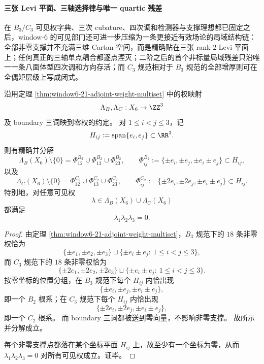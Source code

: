 \paragraph{三张 Levi 平面、三轴选择律与唯一 quartic 残差}
在 \(B_3/C_3\) 可见权字典、三次 cubature、四次调和检测器与支撑理想都已固定之后，window-\(6\) 的可见部门还可进一步压缩为一条更接近有效场论的局域结构链：全部非零支撑并不充满三维 Cartan 空间，而是精确贴在三张 rank-\(2\) Levi 平面上；任何真正的三轴单点耦合都逐点湮灭；二阶之后的首个非标量局域残差只沿唯一一条八面体型四次调和方向存活；而 \(C_3\) 规范相对于 \(B_3\) 规范的全部增厚则可在全偶矩层级上写成闭式。

\begin{theorem}\label{thm:window6-b3c3-visible-support-three-levi-planes}
沿用定理 \ref{thm:window6-21-adjoint-weight-multiset} 中的权映射
\[
\Lambda_B,\Lambda_C:X_6\to \ZZ^3
\]
及 boundary 三词映到零权的约定。
对 \(1\le i<j\le 3\)，记
\[
H_{ij}:=\operatorname{span}\{e_i,e_j\}\subset \RR^3.
\]
则有精确并分解
\[
\Lambda_B(X_6)\setminus\{0\}
=
\Phi^{B_2}_{12}\cup \Phi^{B_2}_{13}\cup \Phi^{B_2}_{23},
\qquad
\Phi^{B_2}_{ij}:=\{\pm e_i,\pm e_j,\pm e_i\pm e_j\}\subset H_{ij},
\]
以及
\[
\Lambda_C(X_6)\setminus\{0\}
=
\Phi^{C_2}_{12}\cup \Phi^{C_2}_{13}\cup \Phi^{C_2}_{23},
\qquad
\Phi^{C_2}_{ij}:=\{\pm 2e_i,\pm 2e_j,\pm e_i\pm e_j\}\subset H_{ij}.
\]
特别地，对任意可见权
\[
\lambda\in \Lambda_B(X_6)\cup \Lambda_C(X_6)
\]
都满足
\[
\lambda_1\lambda_2\lambda_3=0.
\]
\end{theorem}
\begin{proof}
由定理 \ref{thm:window6-21-adjoint-weight-multiset}，\(B_3\) 规范下的 \(18\) 条非零权恰为
\[
\{\pm e_1,\pm e_2,\pm e_3\}
\sqcup
\{\pm e_i\pm e_j:\ 1\le i<j\le 3\},
\]
而 \(C_3\) 规范下的 \(18\) 条非零权恰为
\[
\{\pm 2e_1,\pm 2e_2,\pm 2e_3\}
\sqcup
\{\pm e_i\pm e_j:\ 1\le i<j\le 3\}.
\]
按零坐标的位置分组，在 \(B_3\) 规范下每个 \(H_{ij}\) 内恰出现
\[
\{\pm e_i,\pm e_j,\pm e_i\pm e_j\},
\]
即一个 \(B_2\) 根系；在 \(C_3\) 规范下每个 \(H_{ij}\) 内恰出现
\[
\{\pm 2e_i,\pm 2e_j,\pm e_i\pm e_j\},
\]
即一个 \(C_2\) 根系。
而 boundary 三词都被送到零向量，不影响非零支撑。
故所示并分解成立。

每个非零支撑点都落在某个坐标平面 \(H_{ij}\) 上，故至少有一个坐标为零，从而
\(
\lambda_1\lambda_2\lambda_3=0
\)
对所有可见权成立。证毕。
\end{proof}

